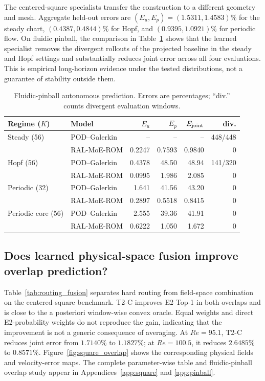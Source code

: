 The centered-square specialists transfer the construction to a different geometry and mesh. Aggregate held-out errors are $(E_u,E_p)=(1.5311,1.4583)\%$ for the steady chart, $(0.4387,0.4844)\%$ for Hopf, and $(0.9395,1.0921)\%$ for periodic flow. On fluidic pinball, the comparison in Table~\ref{tab:pinball_autonomous} shows that the learned specialist removes the divergent rollouts of the projected baseline in the steady and Hopf settings and substantially reduces joint error across all four evaluations. This is empirical long-horizon evidence under the tested distributions, not a guarantee of stability outside them.

\begin{table}[t]
\centering
\caption{Fluidic-pinball autonomous prediction. Errors are percentages; ``div.'' counts divergent evaluation windows.}
\label{tab:pinball_autonomous}
\small
\setlength{\tabcolsep}{3.5pt}
\begin{tabular}{llrrrr}
\toprule
Regime ($K$) & Model & $E_u$ & $E_p$ & $E_{\rm joint}$ & div. \\
\midrule
Steady (56) & POD--Galerkin & -- & -- & -- & 448/448 \\
            & RAL-MoE-ROM & 0.2247 & 0.7593 & 0.9840 & 0 \\
Hopf (56)   & POD--Galerkin & 0.4378 & 48.50 & 48.94 & 141/320 \\
            & RAL-MoE-ROM & 0.0995 & 1.986 & 2.085 & 0 \\
Periodic (32) & POD--Galerkin & 1.641 & 41.56 & 43.20 & 0 \\
            & RAL-MoE-ROM & 0.2897 & 0.5518 & 0.8415 & 0 \\
Periodic core (56) & POD--Galerkin & 2.555 & 39.36 & 41.91 & 0 \\
            & RAL-MoE-ROM & 0.6222 & 1.050 & 1.672 & 0 \\
\bottomrule
\end{tabular}
\end{table}

\subsection{Does learned physical-space fusion improve overlap prediction?}

Table~\ref{tab:routing_fusion} separates hard routing from field-space combination on the centered-square benchmark. T2-C improves E2 Top-1 in both overlaps and is close to the a posteriori window-wise convex oracle. Equal weights and direct E2-probability weights do not reproduce the gain, indicating that the improvement is not a generic consequence of averaging. At $Re=95.1$, T2-C reduces joint error from $1.7140\%$ to $1.1827\%$; at $Re=100.5$, it reduces $2.6485\%$ to $0.8571\%$. Figure~\ref{fig:square_overlap} shows the corresponding physical fields and velocity-error maps. The complete parameter-wise table and fluidic-pinball overlap study appear in Appendices~\ref{app:square} and \ref{app:pinball}.

